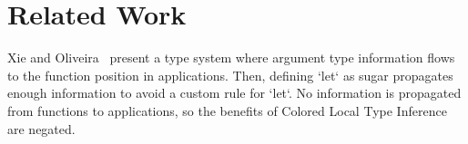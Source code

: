 \documentclass[9pt]{extarticle}
\begin{document}
\section{Related Work}

Xie and Oliveira~\cite{xie2018let} present a type system where
argument type information flows to the function position in applications.
Then, defining `let` as sugar propagates enough information to avoid
a custom rule for `let`.
No information is propagated from functions to applications, so the benefits
of Colored Local Type Inference are negated.

%




\printbibliography
\end{document}
